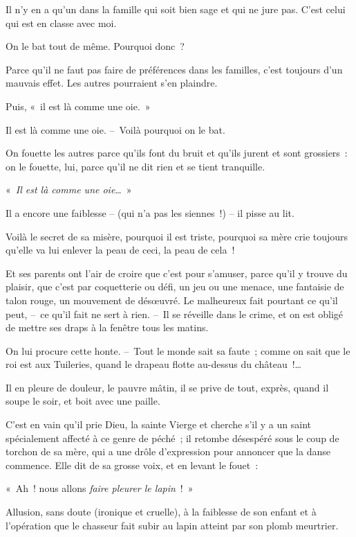 \documentclass[french,twoside]{book} %
\begin{document}
Il n’y en a qu’un dans la famille qui soit bien sage et qui ne jure pas. C’est celui qui est en classe avec moi.\par
On le bat tout de même. Pourquoi donc ?\par
Parce qu’il ne faut pas faire de préférences dans les familles, c’est toujours d’un mauvais effet. Les autres pourraient s’en plaindre.\par
Puis, « il est là comme une oie. »\par
Il est là comme une oie. – Voilà pourquoi on le bat.\par
On fouette les autres parce qu’ils font du bruit et qu’ils jurent et sont grossiers : on le fouette, lui, parce qu’il ne dit rien et se tient tranquille.\par
« \emph{Il est là comme une oie}… »\par
Il a encore une faiblesse – (qui n’a pas les siennes !) – il pisse au lit.\par
Voilà le secret de sa misère, pourquoi il est triste, pourquoi sa mère crie toujours qu’elle va lui enlever la peau de ceci, la peau de cela !\par
Et ses parents ont l’air de croire que c’est pour s’amuser, parce qu’il y trouve du plaisir, que c’est par coquetterie ou défi, un jeu ou une menace, une fantaisie de talon rouge, un mouvement de désœuvré. Le malheureux fait pourtant ce qu’il peut, – ce qu’il fait ne sert à rien. – Il se réveille dans le crime, et on est obligé de mettre ses draps à la fenêtre tous les matins.\par
On lui procure cette honte. – Tout le monde sait sa faute ; comme on sait que le roi est aux Tuileries, quand le drapeau flotte au-dessus du château !…\par
Il en pleure de douleur, le pauvre mâtin, il se prive de tout, exprès, quand il soupe le soir, et boit avec une paille.\par
C’est en vain qu’il prie Dieu, la sainte Vierge et cherche s’il y a un saint spécialement affecté à ce genre de péché ; il retombe désespéré sous le coup de torchon de sa mère, qui a une drôle d’expression pour annoncer que la danse commence. Elle dit de sa grosse voix, et en levant le fouet :\par
« Ah ! nous allons \emph{faire pleurer le lapin} ! »\par
Allusion, sans doute (ironique et cruelle), à la faiblesse de son enfant et à l’opération que le chasseur fait subir au lapin atteint par son plomb meurtrier.\par
\end{document}

